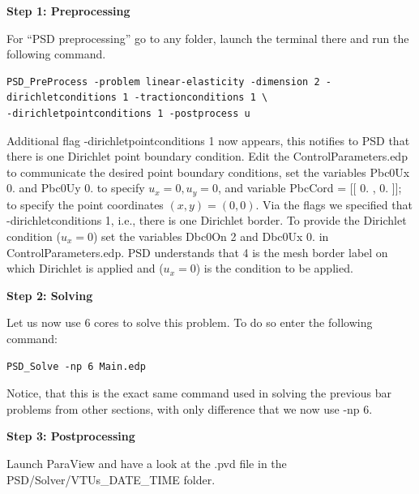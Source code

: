 \textbf{Step 1: Preprocessing}

For ``PSD preprocessing'' go to any folder, launch the terminal there and run the following command.
\begin{lstlisting}[style=BashInputStyle]
PSD_PreProcess -problem linear-elasticity -dimension 2 -dirichletconditions 1 -tractionconditions 1 \
-dirichletpointconditions 1 -postprocess u
\end{lstlisting}

Additional flag {\ttfamily -dirichletpointconditions 1} now appears, this notifies to PSD that there is one Dirichlet point boundary condition. Edit the  {\ttfamily ControlParameters.edp} to communicate the desired point boundary conditions, set the variables {\ttfamily Pbc0Ux  0.} and {\ttfamily Pbc0Uy  0.} to specify $u_x=0,u_y=0$, and variable {\ttfamily PbcCord = [[  0. , 0. ]];} to specify the point coordinates $(x,y)=(0,0)$. Via the flags we specified that {\ttfamily -dirichletconditions 1}, i.e., there is one Dirichlet border.
To provide the Dirichlet condition ($u_x=0$) set the variables {\ttfamily Dbc0On 2} and {\ttfamily Dbc0Ux 0.}  in {\ttfamily ControlParameters.edp}. PSD understands that 4 is the mesh border label on which Dirichlet is applied and ($u_x=0$) is the condition to be applied.

\textbf{Step 2: Solving}

Let us now use 6 cores to solve this problem. To do so enter the following command:

\begin{lstlisting}[style=BashInputStyle]
PSD_Solve -np 6 Main.edp
\end{lstlisting}
%
Notice, that this is the exact same command used in solving the previous bar problems from other sections, with only difference that we now use {\ttfamily -np 6}.


\textbf{Step 3: Postprocessing}

Launch ParaView and have a look at the  {\ttfamily .pvd} file in the  {\ttfamily PSD/Solver/VTUs\_DATE\_TIME} folder. 

